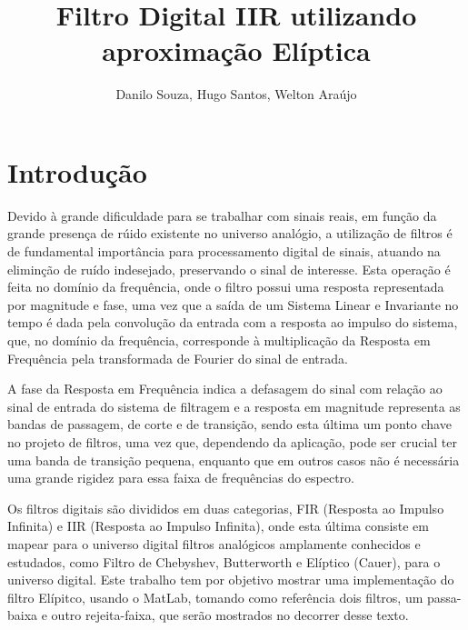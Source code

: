 \documentclass[a4paper,10pt]{article}
\title{Filtro Digital IIR utilizando aproximação Elíptica}
\author{Danilo Souza, Hugo Santos, Welton Araújo}
\begin{document}
\maketitle

\section{Introdução}



Devido à grande dificuldade para se trabalhar com sinais reais, em função da grande  presença de rúido existente no universo analógio, a utilização de filtros é de fundamental importância para processamento digital de sinais, atuando na eliminção de ruído indesejado, preservando o sinal de interesse. Esta operação é feita no domínio da frequência, onde o filtro possui uma resposta representada por magnitude e fase, uma vez que a saída de um Sistema Linear e Invariante no tempo é dada pela convolução da entrada com a resposta ao impulso do sistema, que, no domínio da frequência, corresponde à multiplicação da Resposta em Frequência pela transformada de Fourier do sinal de entrada.

A fase da Resposta em Frequência indica a defasagem do sinal com relação ao sinal de entrada do sistema de filtragem e a resposta em magnitude representa as bandas de passagem, de corte e de transição, sendo esta última um ponto chave no projeto de filtros, uma vez que, dependendo da aplicação, pode ser crucial ter uma banda de transição pequena, enquanto que em outros casos não é necessária uma grande rigidez para essa faixa de frequências do espectro.
 
Os filtros digitais são divididos em duas categorias, FIR (Resposta ao Impulso Infinita) e IIR (Resposta ao Impulso Infinita), onde esta última consiste em mapear para o universo digital filtros analógicos amplamente conhecidos e estudados, como Filtro de Chebyshev, Butterworth e Elíptico (Cauer), para o universo digital. 
Este trabalho tem por objetivo mostrar uma implementação do filtro Elípitco, usando o MatLab, tomando como referência dois filtros, um passa-baixa e outro rejeita-faixa, que serão mostrados no decorrer desse texto.   
\end{document}
